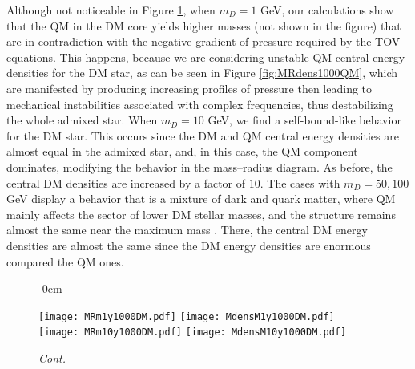 \documentclass[universe,article,accept,moreauthors,pdftex]{Definitions/mdpi}
\begin{document}
Although not noticeable in Figure \ref{fig:MRdens1000DM}, when $m_{D}=1$ GeV, our calculations show that the QM in the DM core yields higher masses (not shown in the figure) that are in contradiction with the negative gradient of pressure required by the TOV equations. This happens, because we are considering unstable QM central energy densities for the DM star, as can be seen in Figure \ref{fig:MRdens1000QM}, which are manifested by producing increasing profiles of pressure then leading to mechanical instabilities associated with complex frequencies, thus destabilizing the whole admixed star. When $m_{D}=10$ GeV, we find a self-bound-like behavior for the DM star. This occurs since the DM and QM central energy densities are almost equal in the admixed star, and, in this case, the QM component dominates, modifying the behavior in the mass--radius diagram. As before, the central DM densities are increased by a factor of $10$. The cases with $m_{D}=50, 100$ GeV display a behavior that is a mixture of dark and quark matter, where QM mainly affects the sector of lower DM stellar masses, and the structure remains almost the same near the maximum mass . There, the central DM energy densities are almost the same since the DM energy densities are enormous compared the QM ones.

\begin{figure}[H]

\begin{adjustwidth}{-\extralength}{0cm}
\centering %

{\texttt{[image: MRm1y1000DM.pdf]}\vspace{3pt}
	  \texttt{[image: MdensM1y1000DM.pdf]}}\\
{\texttt{[image: MRm10y1000DM.pdf]}\vspace{3pt}
	  \texttt{[image: MdensM10y1000DM.pdf]}}\\
\end{adjustwidth}
\caption{\emph{Cont.}}
\label{fig:MRdens1000DM}

\end{figure}
\end{document}
